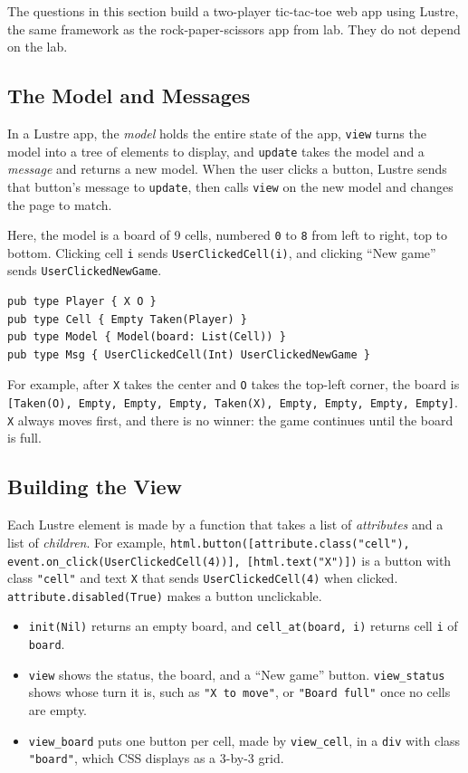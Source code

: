 The questions in this section build a two-player tic-tac-toe web app using Lustre, the same framework as the rock-paper-scissors app from lab. They do not depend on the lab.

\subsection*{The Model and Messages}

In a Lustre app, the \emph{model} holds the entire state of the app, \texttt{view} turns the model into a tree of elements to display, and \texttt{update} takes the model and a \emph{message} and returns a new model. When the user clicks a button, Lustre sends that button's message to \texttt{update}, then calls \texttt{view} on the new model and changes the page to match.

Here, the model is a board of 9 cells, numbered \texttt{0} to \texttt{8} from left to right, top to bottom. Clicking cell \texttt{i} sends \lstinline{UserClickedCell(i)}, and clicking ``New game'' sends \lstinline{UserClickedNewGame}.
\begin{lstlisting}
pub type Player { X O }
pub type Cell { Empty Taken(Player) }
pub type Model { Model(board: List(Cell)) }
pub type Msg { UserClickedCell(Int) UserClickedNewGame }
\end{lstlisting}
For example, after \texttt{X} takes the center and \texttt{O} takes the top-left corner, the board is \lstinline{[Taken(O), Empty, Empty, Empty, Taken(X), Empty, Empty, Empty, Empty]}. \texttt{X} always moves first, and there is no winner: the game continues until the board is full.

\subsection*{Building the View}

Each Lustre element is made by a function that takes a list of \emph{attributes} and a list of \emph{children}. For example, \lstinline{html.button([attribute.class("cell"), event.on_click(UserClickedCell(4))], [html.text("X")])} is a button with class \texttt{"cell"} and text \texttt{X} that sends \lstinline{UserClickedCell(4)} when clicked. \lstinline{attribute.disabled(True)} makes a button unclickable.
\begin{itemize}
  \item \lstinline{init(Nil)} returns an empty board, and \lstinline{cell_at(board, i)} returns cell \texttt{i} of \texttt{board}.
  \item \texttt{view} shows the status, the board, and a ``New game'' button. \texttt{view\_status} shows whose turn it is, such as \texttt{"X to move"}, or \texttt{"Board full"} once no cells are empty.
  \item \texttt{view\_board} puts one button per cell, made by \texttt{view\_cell}, in a \lstinline{div} with class \texttt{"board"}, which CSS displays as a 3-by-3 grid.
\end{itemize}

